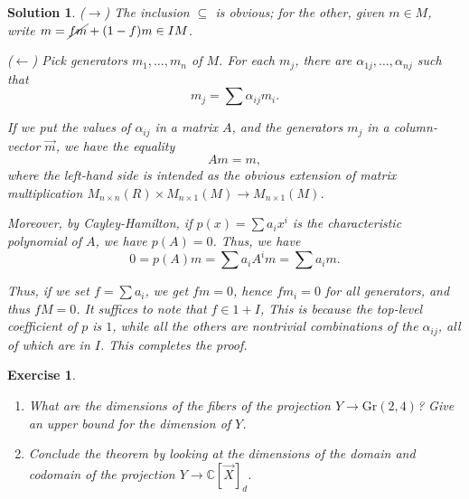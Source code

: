 \documentclass{article}
\newtheorem{ex}{Exercise}
\theoremstyle{nonumberplain}
\newtheorem{sol}{Solution}
\newcommand{\C}{\mathbb{C}}
\newcommand{\Gr}{\mathrm{Gr}}
\begin{document}
\begin{sol}
($\rightarrow$) The inclusion $\subseteq$ is obvious; for the other, given $m \in M$, write $m = \cancel{f m} + (1-f) m \in IM$.

\smallskip

($\leftarrow$) Pick generators $m_1, \dots, m_n$ of $M$. For each $m_j$, there are $\alpha_{1j}, \dots, \alpha_{nj}$ such that
\begin{equation}
m_j = \sum \alpha_{ij} m_i.
\end{equation}

If we put the values of $\alpha_{ij}$ in a matrix $A$, and the generators $m_j$ in a column-vector $\vec m$, we have the equality
\begin{equation}
A m = m,
\end{equation}
where the left-hand side is intended as the obvious extension of matrix multiplication $M_{n \times n}(R) \times M_{n \times 1}(M) \to M_{n \times 1}(M)$.

Moreover, by Cayley-Hamilton, if $p(x) = \sum a_i x^i$ is the characteristic polynomial of $A$, we have $p(A) = 0$. Thus, we have
\begin{equation}
0 = p(A) m = \sum a_i A^i m = \sum a_i m.
\end{equation}

Thus, if we set $f = \sum a_i$, we get $f m = 0$, hence $f m_i = 0$ for all generators, and thus $f M = 0$. It suffices to note that $f \in 1 + I$, This is because the top-level coefficient of $p$ is $1$, while all the others are nontrivial combinations of the $\alpha_{ij}$, all of which are in $I$. This completes the proof.
\end{sol}

\begin{ex}
\leavevmode
\begin{enumerate}
\item What are the dimensions of the fibers of the projection $Y \to \Gr(2,4)$? Give an upper bound for the dimension of $Y$.
\item Conclude the theorem by looking at the dimensions of the domain and codomain of the projection $Y \to \C[\vec X]_d$.
\end{enumerate}
\end{ex}
\end{document}
